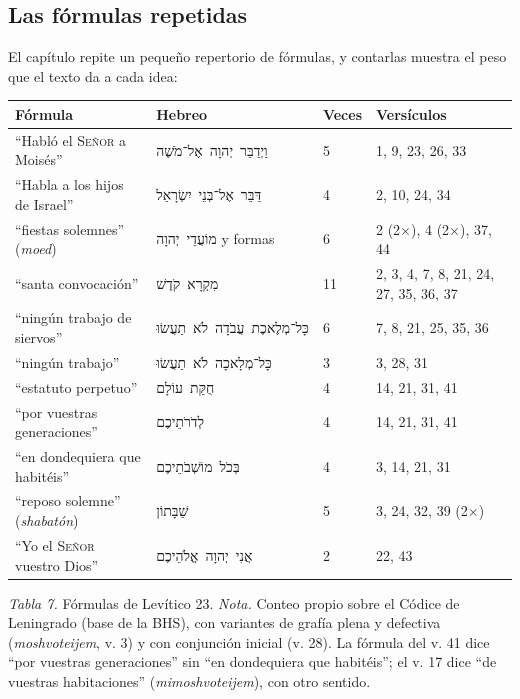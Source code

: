 \documentclass[11pt,letterpaper]{article}
\newcommand{\heb}[1]{\mbox{\foreignlanguage{hebrew}{#1}}}
\newcommand{\SENOR}{\textsc{Señor}}
\begin{document}
\subsection{Las fórmulas repetidas}
El capítulo repite un pequeño repertorio de fórmulas, y contarlas muestra el peso que el texto da a cada idea:

\begin{center}\small\renewcommand{\arraystretch}{1.18}
\begin{tabular}{@{}L{4.6cm}L{4.1cm}L{1.3cm}L{5.0cm}@{}}
\toprule
\textbf{Fórmula} & \textbf{Hebreo} & \textbf{Veces} & \textbf{Versículos} \\ \midrule
``Habló el \SENOR{} a Moisés'' & \heb{וַיְדַבֵּר יְהוָה אֶל־מֹשֶׁה} & 5 & 1, 9, 23, 26, 33 \\
``Habla a los hijos de Israel'' & \heb{דַּבֵּר אֶל־בְּנֵי יִשְׂרָאֵל} & 4 & 2, 10, 24, 34 \\
``fiestas solemnes'' (\emph{moed}) & \heb{מוֹעֲדֵי יְהוָה} y formas & 6 & 2 (2×), 4 (2×), 37, 44 \\
``santa convocación'' & \heb{מִקְרָא קֹדֶשׁ} & 11 & 2, 3, 4, 7, 8, 21, 24, 27, 35, 36, 37 \\
``ningún trabajo de siervos'' & \heb{כָּל־מְלֶאכֶת עֲבֹדָה לֹא תַעֲשׂוּ} & 6 & 7, 8, 21, 25, 35, 36 \\
``ningún trabajo'' & \heb{כָּל־מְלָאכָה לֹא תַעֲשׂוּ} & 3 & 3, 28, 31 \\
``estatuto perpetuo'' & \heb{חֻקַּת עוֹלָם} & 4 & 14, 21, 31, 41 \\
``por vuestras generaciones'' & \heb{לְדֹרֹתֵיכֶם} & 4 & 14, 21, 31, 41 \\
``en dondequiera que habitéis'' & \heb{בְּכֹל מוֹשְׁבֹתֵיכֶם} & 4 & 3, 14, 21, 31 \\
``reposo solemne'' (\emph{shabatón}) & \heb{שַׁבָּתוֹן} & 5 & 3, 24, 32, 39 (2×) \\
``Yo el \SENOR{} vuestro Dios'' & \heb{אֲנִי יְהוָה אֱלֹהֵיכֶם} & 2 & 22, 43 \\
\bottomrule
\end{tabular}\par
{\footnotesize\color{sepia}\textit{Tabla 7.} Fórmulas de Levítico 23. \textit{Nota.} Conteo propio sobre el Códice de Leningrado (base de la BHS), con variantes de grafía plena y defectiva (\emph{moshvoteijem}, v. 3) y con conjunción inicial (v. 28). La fórmula del v. 41 dice ``por vuestras generaciones'' sin ``en dondequiera que habitéis''; el v. 17 dice ``de vuestras habitaciones'' (\emph{mimoshvoteijem}), con otro sentido.}
\end{center}
\end{document}
